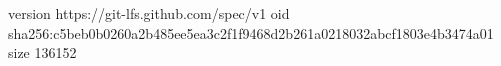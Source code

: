 version https://git-lfs.github.com/spec/v1
oid sha256:c5beb0b0260a2b485ee5ea3c2f1f9468d2b261a0218032abcf1803e4b3474a01
size 136152
